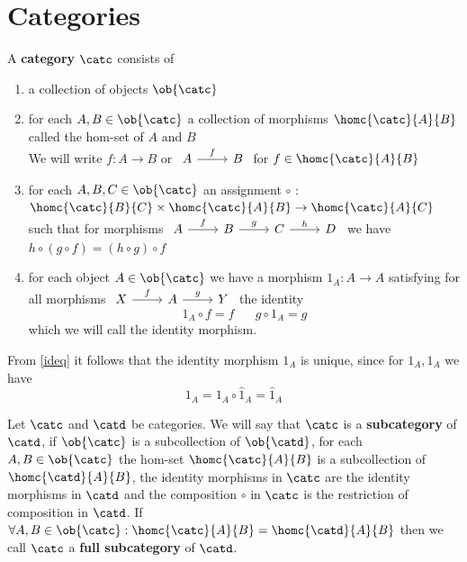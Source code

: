 \section{Categories}
    \begin{definition}
        A \textbf{category} $\catc$ consists of
        \begin{enumerate}
            \item a collection of objects $\ob{\catc}$
            \item for each $A,B\in\ob{\catc}$ a collection of morphisms $\homc{\catc}{A}{B}$ called the hom-set of $A$ and $B$\\
            We will write $f : A\to B$ or
$\begin{tikzcd}
	A & B
	\arrow["f", from=1-1, to=1-2]
\end{tikzcd}$ for $f\in\homc{\catc}{A}{B}$
            \item for each $A,B,C\in\ob{\catc}$ an assignment $\circ$ : $\homc{\catc}{B}{C}\times\homc{\catc}{A}{B}\to \homc{\catc}{A}{C}$ such that
        for morphisms $\begin{tikzcd}
            A & B & C & D
            \arrow["f", from=1-1, to=1-2]
            \arrow["g", from=1-2, to=1-3]
            \arrow["h", from=1-3, to=1-4]
        \end{tikzcd}$ we have $h\circ(g\circ f) = (h\circ g)\circ f$
            \item for each object $A\in\ob{\catc}$ we have a morphism $1_A : A\to A$ satisfying
             for all morphisms $\begin{tikzcd}
                X & A & Y
                \arrow["f", from=1-1, to=1-2]
                \arrow["g", from=1-2, to=1-3]
            \end{tikzcd}$ the identity
            \begin{equation}\label{ideq}1_A \circ f = f \hspace{20pt} g \circ 1_A = g\end{equation}
            which we will call the identity morphism. 
        \end{enumerate}
    \end{definition}
\begin{remark}
    From \eqref{ideq} it follows that the identity morphism $1_A$ is unique, since for $1_A,\hat{1}_A$ we have
    \[1_A = 1_A\circ \hat{1}_A = \hat{1}_A\]
\end{remark}
\begin{definition}
    Let $\catc$ and $\catd$ be categories. We will say that $\catc$ is a \textbf{subcategory} of $\catd$, if 
    $\ob{\catc}$ is a subcollection of $\ob{\catd}$, for each $A,B\in\ob{\catc}$ the hom-set
    $\homc{\catc}{A}{B}$ is a subcollection of $\homc{\catd}{A}{B}$, the identity morphisms in $\catc$ are 
    the identity morphisms in $\catd$ and the composition $\circ$ in $\catc$ is the restriction of composition in $\catd$.
    If $\forall A,B\in\ob{\catc} : \homc{\catc}{A}{B} = \homc{\catd}{A}{B}$
    then we call $\catc$ a \textbf{full subcategory} of $\catd$.
\end{definition}

